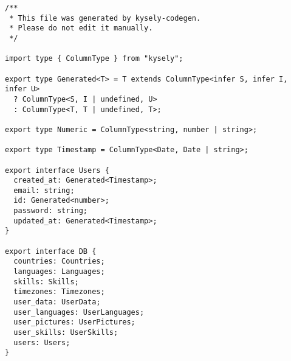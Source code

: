 \begin{verbatim}
/**
 * This file was generated by kysely-codegen.
 * Please do not edit it manually.
 */

import type { ColumnType } from "kysely";

export type Generated<T> = T extends ColumnType<infer S, infer I, infer U>
  ? ColumnType<S, I | undefined, U>
  : ColumnType<T, T | undefined, T>;

export type Numeric = ColumnType<string, number | string>;

export type Timestamp = ColumnType<Date, Date | string>;

export interface Users {
  created_at: Generated<Timestamp>;
  email: string;
  id: Generated<number>;
  password: string;
  updated_at: Generated<Timestamp>;
}

export interface DB {
  countries: Countries;
  languages: Languages;
  skills: Skills;
  timezones: Timezones;
  user_data: UserData;
  user_languages: UserLanguages;
  user_pictures: UserPictures;
  user_skills: UserSkills;
  users: Users;
}
\end{verbatim}